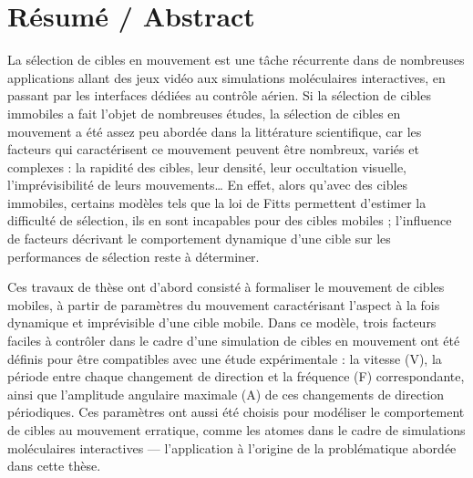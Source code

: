 
\chapter*{Résumé / Abstract}%


%

La sélection de cibles en mouvement est une tâche récurrente dans de nombreuses applications allant des jeux vidéo aux simulations moléculaires interactives, en passant par les interfaces dédiées au contrôle aérien. Si la sélection de cibles immobiles a fait l'objet de nombreuses études, la sélection de cibles en mouvement a été assez peu abordée dans la littérature scientifique, car les facteurs qui caractérisent ce mouvement peuvent être nombreux, variés et complexes : la rapidité des cibles, leur densité, leur occultation visuelle, l'imprévisibilité de leurs mouvements\ldots{} En effet, alors qu’avec des cibles immobiles, certains modèles tels que la loi de Fitts permettent d’estimer la difficulté de sélection, ils en sont incapables pour des cibles mobiles ; l'influence de facteurs décrivant le comportement dynamique d'une cible sur les performances de sélection reste à déterminer.

Ces travaux de thèse ont d'abord consisté à formaliser le mouvement de cibles mobiles, à partir de paramètres du mouvement caractérisant l'aspect à la fois dynamique et imprévisible d'une cible mobile. Dans ce modèle, trois facteurs faciles à contrôler dans le cadre d'une simulation de cibles en mouvement ont été définis pour être compatibles avec une étude expérimentale : la vitesse (V), la période entre chaque changement de direction et la fréquence (F) correspondante, ainsi que l'amplitude angulaire maximale (A) de ces changements de direction périodiques. Ces paramètres ont aussi été choisis pour modéliser le comportement de cibles au mouvement erratique, comme les atomes dans le cadre de simulations moléculaires interactives — l’application à l’origine de la problématique abordée dans cette thèse.


